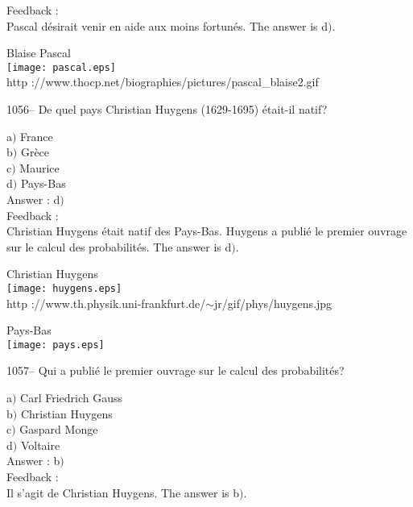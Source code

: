 \documentclass[letterpaper, 12pt]{article}
\begin{document}
Feedback : \\
Pascal d\'esirait venir en aide aux moins fortun\'es.
The answer is d$)$.\\

        \begin{center}
        Blaise Pascal\\
    \texttt{[image: pascal.eps]}\\
        {\footnotesize http
://www.thocp.net/biographies/pictures/pascal\_blaise2.gif}
    \end{center}

1056-- De quel pays Christian Huygens (1629-1695) \'etait-il natif?

a$)$ France \\
b$)$ Gr\`ece  \\
c$)$ Maurice  \\
d$)$ Pays-Bas \\

Answer : d$)$\\

Feedback : \\
Christian Huygens \'etait natif des Pays-Bas. Huygens a publi\'e le
premier ouvrage sur le calcul des probabilit\'es.
The answer is d$)$.\\

        \begin{center}
        Christian Huygens\\
    \texttt{[image: huygens.eps]}\\
        {\footnotesize http
://www.th.physik.uni-frankfurt.de/$\sim$jr/gif/phys/huygens.jpg}
    \end{center}

        \begin{center}
        Pays-Bas\\
    \texttt{[image: pays.eps]}\\
    \end{center}

1057-- Qui a publi\'e le premier ouvrage sur le calcul des
probabilit\'es?

a$)$ Carl Friedrich Gauss \\
b$)$ Christian Huygens \\
c$)$ Gaspard Monge  \\
d$)$ Voltaire  \\

Answer : b$)$\\

Feedback : \\
Il s'agit de Christian Huygens.
The answer is b$)$.\\
\end{document}
